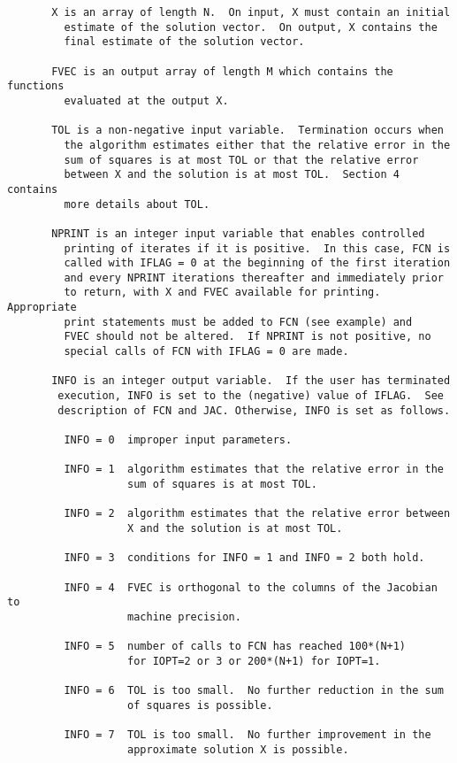 \begin{verbatim}
       X is an array of length N.  On input, X must contain an initial
         estimate of the solution vector.  On output, X contains the
         final estimate of the solution vector.

       FVEC is an output array of length M which contains the functions
         evaluated at the output X.

       TOL is a non-negative input variable.  Termination occurs when
         the algorithm estimates either that the relative error in the
         sum of squares is at most TOL or that the relative error
         between X and the solution is at most TOL.  Section 4 contains
         more details about TOL.

       NPRINT is an integer input variable that enables controlled
         printing of iterates if it is positive.  In this case, FCN is
         called with IFLAG = 0 at the beginning of the first iteration
         and every NPRINT iterations thereafter and immediately prior
         to return, with X and FVEC available for printing. Appropriate
         print statements must be added to FCN (see example) and
         FVEC should not be altered.  If NPRINT is not positive, no
         special calls of FCN with IFLAG = 0 are made.

       INFO is an integer output variable.  If the user has terminated
        execution, INFO is set to the (negative) value of IFLAG.  See
        description of FCN and JAC. Otherwise, INFO is set as follows.

         INFO = 0  improper input parameters.

         INFO = 1  algorithm estimates that the relative error in the
                   sum of squares is at most TOL.

         INFO = 2  algorithm estimates that the relative error between
                   X and the solution is at most TOL.

         INFO = 3  conditions for INFO = 1 and INFO = 2 both hold.

         INFO = 4  FVEC is orthogonal to the columns of the Jacobian to
                   machine precision.

         INFO = 5  number of calls to FCN has reached 100*(N+1)
                   for IOPT=2 or 3 or 200*(N+1) for IOPT=1.

         INFO = 6  TOL is too small.  No further reduction in the sum
                   of squares is possible.

         INFO = 7  TOL is too small.  No further improvement in the
                   approximate solution X is possible.


\end{verbatim}
